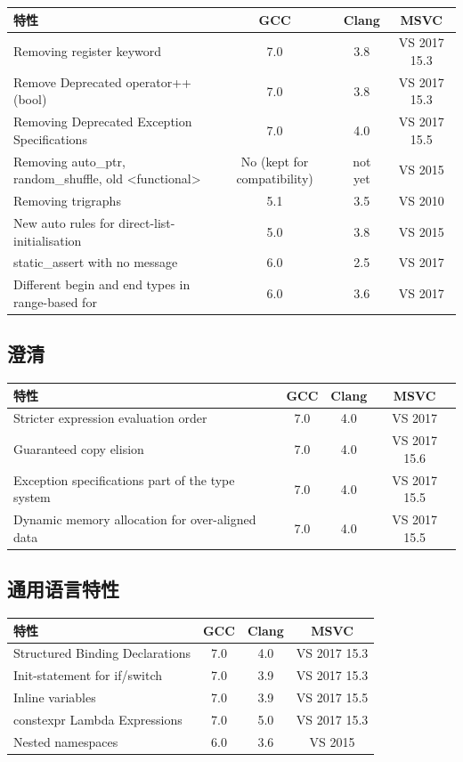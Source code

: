 \begin{table}[H]
\centering
\begin{tabularx}{\textwidth}{X c c c}
\toprule
特性 & GCC & Clang & MSVC \\
\midrule
Removing register keyword & 7.0 & 3.8 & VS 2017 15.3 \\
Remove Deprecated operator++(bool) & 7.0 & 3.8 & VS 2017 15.3 \\
Removing Deprecated Exception Specifications & 7.0 & 4.0 & VS 2017 15.5 \\
Removing auto\_ptr, random\_shuffle, old <functional> & No (kept for compatibility) & not yet & VS 2015 \\
Removing trigraphs & 5.1 & 3.5 & VS 2010 \\
New auto rules for direct-list-initialisation & 5.0 & 3.8 & VS 2015 \\
static\_assert with no message & 6.0 & 2.5 & VS 2017 \\
Different begin and end types in range-based for & 6.0 & 3.6 & VS 2017 \\
\bottomrule
\end{tabularx}
\end{table}

\subsection{澄清}

\begin{table}[H]
\centering
\begin{tabularx}{\textwidth}{X c c c}
\toprule
特性 & GCC & Clang & MSVC \\
\midrule
Stricter expression evaluation order & 7.0 & 4.0 & VS 2017 \\
Guaranteed copy elision & 7.0 & 4.0 & VS 2017 15.6 \\
Exception specifications part of the type system & 7.0 & 4.0 & VS 2017 15.5 \\
Dynamic memory allocation for over-aligned data & 7.0 & 4.0 & VS 2017 15.5 \\
\bottomrule
\end{tabularx}
\end{table}

\subsection{通用语言特性}

\begin{table}[H]
\centering
\begin{tabularx}{\textwidth}{X c c c}
\toprule
特性 & GCC & Clang & MSVC \\
\midrule
Structured Binding Declarations & 7.0 & 4.0 & VS 2017 15.3 \\
Init-statement for if/switch & 7.0 & 3.9 & VS 2017 15.3 \\
Inline variables & 7.0 & 3.9 & VS 2017 15.5 \\
constexpr Lambda Expressions & 7.0 & 5.0 & VS 2017 15.3 \\
Nested namespaces & 6.0 & 3.6 & VS 2015 \\
\bottomrule
\end{tabularx}
\end{table}

